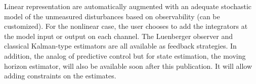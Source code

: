 Linear representation are automatically augmented with an adequate stochastic model of the unmeasured disturbances based on observability (can be customized). For the nonlinear case, the user chooses to add the integrators at the model input or output on each channel. The Luenberger observer and classical Kalman-type estimators are all available as feedback strategies. In addition, the analog of predictive control but for state estimation, the moving horizon estimator, will also be available soon after this publication. It will allow adding constraints on the estimates.

